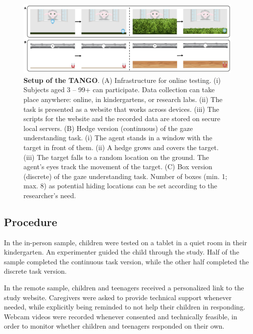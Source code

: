 \documentclass[
  man,floatsintext]{apa6}
\begin{document}
\begin{figure}

{\centering \includegraphics[width=1\linewidth]{../figures/procedure} 

}

\caption{\textbf{Setup of the TANGO}. (A) Infrastructure for online testing. (i) Subjects aged 3 -- 99+ can participate. Data collection can take place anywhere: online, in kindergartens, or research labs. (ii) The task is presented as a website that works across devices. (iii) The scripts for the website and the recorded data are stored on secure local servers. (B) Hedge version (continuous) of the gaze understanding task. (i) The agent stands in a window with the target in front of them. (ii) A hedge grows and covers the target. (iii) The target falls to a random location on the ground. The agent's eyes track the movement of the target. (C) Box version (discrete) of the gaze understanding task. Number of boxes (min. 1; max. 8) as potential hiding locations can be set according to the researcher's need.}\label{fig:fig1}
\end{figure}

\hypertarget{procedure}{%
\subsection{Procedure}\label{procedure}}

In the in-person sample, children were tested on a tablet in a quiet room in their kindergarten.
An experimenter guided the child through the study.
Half of the sample completed the continuous task version, while the other half completed the discrete task version.

In the remote sample, children and teenagers received a personalized link to the study website.
Caregivers were asked to provide technical support whenever needed, while explicitly being reminded to not help their children in responding.
Webcam videos were recorded whenever consented and technically feasible, in order to monitor whether children and teenagers responded on their own.
\end{document}
